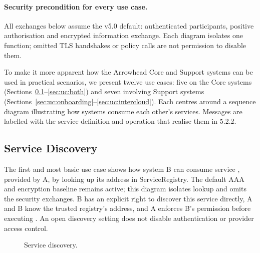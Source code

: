 \documentclass[a4paper]{arrowhead}
\newcommand{\svc}[1]{\textcolor{ArrowheadPurple}{\textit{\ahbreak{#1}}}}    %
\newcommand{\seqhead}[4]{\node[hd, #4] at (#2,0) {#3}; \draw[lifeline] (#2,-0.45) -- (#2,-#1);}
\begin{document}
\paragraph{Security precondition for every use case.}
All exchanges below assume the v5.0 default: authenticated participants, positive
authorisation and encrypted information exchange. Each diagram isolates one
function; omitted TLS handshakes or policy calls are not permission to disable them.


To make it more apparent how the Arrowhead Core and Support systems can be used in practical
scenarios, we present twelve use cases: five on the Core systems
(Sections~\ref{sec:uc:discovery}--\ref{sec:uc:both}) and seven involving Support systems
(Sections~\ref{sec:uc:onboarding}--\ref{sec:uc:intercloud}). Each centres around a sequence diagram illustrating how systems consume
each other's services. Messages are labelled with the service definition and operation that
realise them in 5.2.2.

\subsection{Service Discovery}
\label{sec:uc:discovery}

The first and most basic use case shows how system B can consume service \svc{a}, provided by
A, by looking up its address in ServiceRegistry. The default AAA and encryption
baseline remains active; this diagram isolates lookup and omits the security
exchanges. B has an explicit right to discover this service directly, A and B know
the trusted registry's address, and A enforces B's permission before executing
\svc{a}. An open discovery setting does not disable authentication or provider
access control.

\begin{figure}[h!]
\centering
{}
\caption{Service discovery.}
\label{fig:uc1}
\end{figure}
\end{document}

